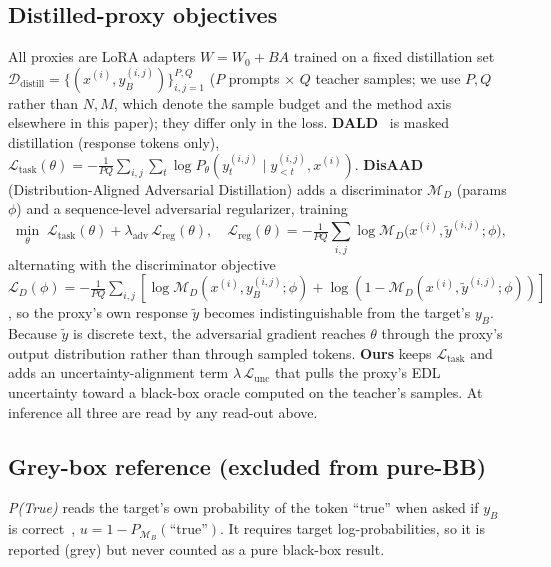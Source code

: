 \documentclass[11pt]{article}
\begin{document}
\subsection{Distilled-proxy objectives}
All proxies are LoRA adapters $W=W_0+BA$ trained on a fixed distillation set
$\mathcal{D}_{\mathrm{distill}}=\{(x^{(i)},y_B^{(i,j)})\}_{i,j=1}^{P,Q}$ ($P$ prompts $\times$ $Q$
teacher samples; we use $P,Q$ rather than $N,M$, which denote the sample budget and the method
axis elsewhere in this paper); they differ only in the loss.
\textbf{DALD}~\citep{zeng2024dald} is masked distillation (response tokens only),
$\mathcal{L}_{\mathrm{task}}(\theta)=-\tfrac{1}{PQ}\sum_{i,j}\sum_t \log P_\theta\!\left(y^{(i,j)}_t\mid y^{(i,j)}_{<t},x^{(i)}\right)$. \textbf{DisAAD} (Distribution-Aligned Adversarial Distillation)
\citep{cui2026disaad} adds a discriminator $\mathcal{M}_D$ (params $\phi$) and a
sequence-level adversarial regularizer, training
\begin{equation}
\min_\theta\; \mathcal{L}_{\mathrm{task}}(\theta) + \lambda_{\mathrm{adv}}\,
\mathcal{L}_{\mathrm{reg}}(\theta), \quad
\mathcal{L}_{\mathrm{reg}}(\theta)=-\tfrac{1}{PQ}\!\sum_{i,j}\!\log \mathcal{M}_D\big(x^{(i)},\tilde{y}^{(i,j)};\phi\big),
\end{equation}
alternating with the discriminator objective $\mathcal{L}_D(\phi)=-\tfrac{1}{PQ}\sum_{i,j}
[\log \mathcal{M}_D(x^{(i)},y_B^{(i,j)};\phi)+\log(1-\mathcal{M}_D(x^{(i)},\tilde{y}^{(i,j)};\phi))]$,
so the proxy's own response $\tilde{y}$ becomes indistinguishable from the target's $y_B$.
Because $\tilde{y}$ is discrete text, the adversarial gradient reaches $\theta$ through the
proxy's output distribution rather than through sampled tokens. \textbf{Ours} keeps
$\mathcal{L}_{\mathrm{task}}$ and adds an uncertainty-alignment term $\lambda\,
\mathcal{L}_{\mathrm{unc}}$ that pulls the proxy's EDL uncertainty toward a black-box oracle
computed on the teacher's samples. At inference all three are read by any read-out above.

\subsection{Grey-box reference (excluded from pure-BB)}
\emph{P(True)} reads the target's own probability of the token ``true'' when asked if $y_B$
is correct~\citep{kadavath2022language}, $u=1-P_{\mathcal{M}_B}(\text{``true''})$. It requires
target log-probabilities, so it is reported (grey) but never counted as a pure black-box
result.
\end{document}
